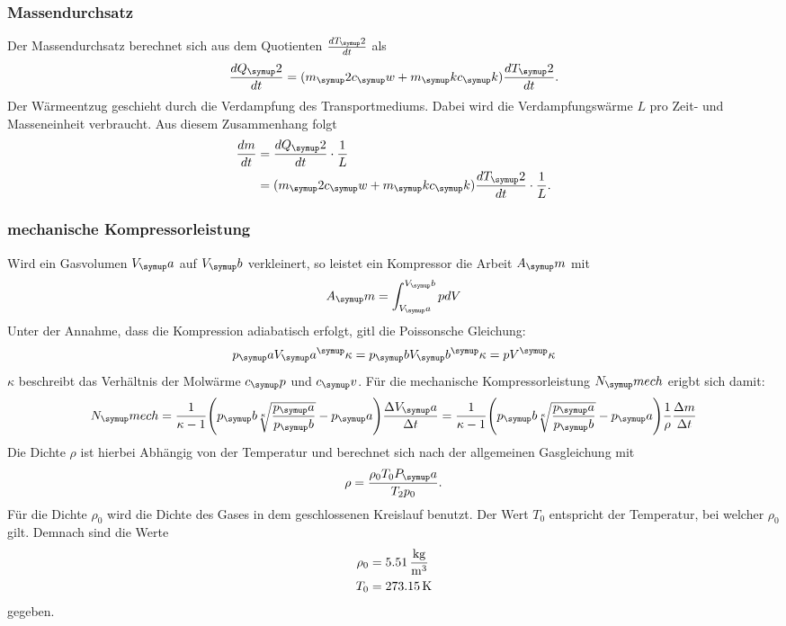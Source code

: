 \subsubsection{Massendurchsatz}
Der Massendurchsatz berechnet sich aus dem Quotienten $\frac{dT_\su{2}}{dt}$ als
\begin{equation}
  \frac{dQ_\su{2}}{dt}= (m_\su{2}c_\su{w}+m_\su{k}c_\su{k})\frac{dT_\su{2}}{dt}.
\end{equation}
Der Wärmeentzug geschieht durch die Verdampfung des Transportmediums. Dabei wird die
Verdampfungswärme $L$ pro Zeit- und Masseneinheit verbraucht. Aus diesem Zusammenhang folgt
\begin{align}
  \frac{dm}{dt} &= \frac{dQ_\su{2}}{dt} \cdot \frac{1}{L} \\
      &= (m_\su{2}c_\su{w}+m_\su{k}c_\su{k})\frac{dT_\su{2}}{dt} \cdot \frac{1}{L}.
      \label{eqn:dm/dt}
\end{align}
\subsubsection{mechanische Kompressorleistung}
Wird ein Gasvolumen $V_\su{a}$ auf $V_\su{b}$ verkleinert, so leistet ein Kompressor
die Arbeit $A_\su{m}$ mit
\begin{equation}
  A_\su{m} = \int_{V_\su{a}}^{V_\su{b}}pdV
\end{equation}
Unter der Annahme, dass die Kompression adiabatisch erfolgt, gitl die Poissonsche
Gleichung:
\begin{equation}
  p_\su{a}V_\su{a}^\su{\kappa} = p_\su{b}V_\su{b}^\su{\kappa} = pV^\su{\kappa}
\end{equation}
$\kappa$ beschreibt das Verhältnis der Molwärme $c_\su{p}$ und $c_\su{v}$.
Für die mechanische Kompressorleistung $N_\su{mech}$ erigbt sich damit:
\begin{equation}
  N_\su{mech}= \frac{1}{\kappa-1}\Biggl(p_\su{b}\sqrt[\kappa]{\frac{p_\su{a}}{p_\su{b}}}-p_\su{a}
  \Biggr)\frac{\Delta V_\su{a}}{\Delta t} = \frac{1}{\kappa-1}\Biggl(p_\su{b}\sqrt[\kappa]{\frac{p_\su{a}}{p_\su{b}}}-p_\su{a}
  \Biggr)\frac{1}{\rho}\frac{\Delta m}{\Delta t}
  \label{eqn:Nmech}
\end{equation}
Die Dichte $\rho$ ist hierbei Abhängig von der Temperatur und berechnet sich
nach der allgemeinen Gasgleichung mit
\begin{equation}
  \rho=\frac{\rho_0 T_0 P_\su{a}}{T_2 p_0}\label{eqn:rho}.
\end{equation}
Für die Dichte $\rho_0$ wird die Dichte des Gases in dem geschlossenen Kreislauf
benutzt. Der Wert $T_0$ entspricht der Temperatur, bei welcher $\rho_0$ gilt.
Demnach sind die Werte
\begin{align*}
  \rho_0 &= 5.51 \,\si{\kilo\gram\per\cubic\meter} \\
  T_0 &= 273.15 \,\si{\kelvin}
\end{align*}
gegeben.
